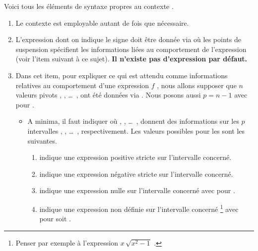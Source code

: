 Voici tous les éléments de syntaxe propres au contexte .
%
\begin{enumerate}
    \item Le contexte  est employable autant de fois que nécessaire.


    \item L'expression dont on indique le signe doit être donnée via  où les points de suspension spécifient les informations liées au comportement de l'expression (voir l'item suivant à ce sujet).
    \textbf{Il n'existe pas d'expression par défaut.}


    \item Dans cet item, pour expliquer ce qui est attendu comme informations relatives au comportement d'une expression $f$ , nous allons supposer que $n$ valeurs pivots  ,  , \dots\ ,  ont été données via  . Nous posons aussi $p = n - 1$ avec  pour  .
    \begin{itemize}
        \item A minima, il faut indiquer
        où
         ,  , \dots\ , 
        donnent des informations sur les $p$ intervalles
        \tdocinlatex{]x_1 ; x_2[} , \tdocinlatex{]x_2 ; x_3[} , \dots\ , \tdocinlatex{]x_p ; x_n[} respectivement.
        Les valeurs possibles pour les  sont les suivantes.
        \begin{enumerate}
            \item \tdocinlatex{+} indique une expression positive stricte sur l'intervalle concerné.

            \item \tdocinlatex{-} indique une expression négative stricte sur l'intervalle concerné.

            \item {} indique une expression nulle sur l'intervalle concerné avec  pour .

            \item {} indique une expression non définie sur l'intervalle concerné
            \footnote{
                Penser par exemple à l'expression $x \, \sqrt{x^2 - 1}$ .
            }
            avec  pour  soit .
        \end{enumerate}



\end{itemize}
\end{enumerate}
